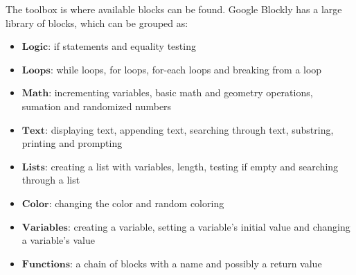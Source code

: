 \documentclass[]{article}
\begin{document}
The toolbox is where available blocks can be found. Google Blockly has a large library of blocks, which can be grouped as:
\begin{itemize}
  \item$\textbf{Logic}$: if statements and equality testing
  \item$\textbf{Loops}$: while loops, for loops, for-each loops and breaking from a loop
  \item$\textbf{Math}$: incrementing variables, basic math and geometry operations, sumation and randomized numbers
  \item$\textbf{Text}$: displaying text, appending text, searching through text, substring, printing and prompting
  \item$\textbf{Lists}$: creating a list with variables, length, testing if empty and searching through a list
  \item$\textbf{Color}$: changing the color and random coloring
  \item$\textbf{Variables}$: creating a variable, setting a variable's initial value and changing a variable's value
  \item$\textbf{Functions}$: a chain of blocks with a name and possibly a return value
\end{itemize}
\end{document}
